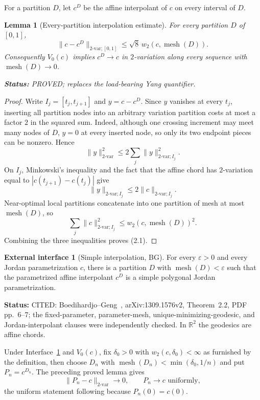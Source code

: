 \documentclass[11pt]{article}
\newtheorem{lemma}[theorem]{Lemma}
\theoremstyle{definition}
\newtheorem{hypothesis}[theorem]{External interface}
\theoremstyle{remark}
\newcommand{\R}{\mathbb R}
\newcommand{\mesh}{\operatorname{mesh}}
\newcommand{\status}[1]{\par\smallskip\noindent\textbf{Status:}
  \begingroup\small\sffamily #1.\endgroup\par\smallskip}
\begin{document}
For a partition $D$, let $c^D$ be the affine interpolant of $c$ on every
interval of $D$.

\begin{lemma}[Every-partition interpolation estimate]
For every partition $D$ of $[0,1]$,
\[
 \|c-c^D\|_{2\text{-var};[0,1]}
 \leq \sqrt8\,w_2(c,\mesh(D)).                         \tag{2.1}
\]
Consequently $V_0(c)$ implies $c^D\to c$ in $2$-variation along
\emph{every} sequence with $\mesh(D)\to0$.
\status{PROVED; replaces the load-bearing Yang quantifier}
\end{lemma}

\begin{proof}
Write $I_j=[t_j,t_{j+1}]$ and $y=c-c^D$.  Since $y$ vanishes at every
$t_j$, inserting all partition nodes into an arbitrary variation partition
costs at most a factor $2$ in the squared sum.  Indeed, although one
crossing increment may meet many nodes of $D$, $y=0$ at every inserted
node, so only its two endpoint pieces can be nonzero.  Hence
\[
 \|y\|_{2\text{-var}}^2
 \leq2\sum_j\|y\|_{2\text{-var};I_j}^2.
\]
On $I_j$, Minkowski's inequality and the fact that the affine chord has
$2$-variation equal to $|c(t_{j+1})-c(t_j)|$ give
\[
 \|y\|_{2\text{-var};I_j}
 \leq2\|c\|_{2\text{-var};I_j}.
\]
Near-optimal local partitions concatenate into one partition of mesh at
most $\mesh(D)$, so
\[
 \sum_j\|c\|_{2\text{-var};I_j}^2
 \leq w_2(c,\mesh(D))^2.
\]
Combining the three inequalities proves (2.1).
\end{proof}

\begin{hypothesis}[Simple interpolation, BG]\label{hyp:bg}
For every $\varepsilon>0$ and every Jordan parametrization $c$, there is a
partition $D$ with $\mesh(D)<\varepsilon$ such that the parametrized affine
interpolant $c^D$ is a simple polygonal Jordan parametrization.
\status{CITED: Boedihardjo--Geng~\cite{BG}, arXiv:1309.1576v2, Theorem~2.2,
PDF pp.~6--7; the fixed-parameter, parameter-mesh, unique-minimizing-geodesic,
and Jordan-interpolant clauses were independently checked.  In $\R^2$ the
geodesics are affine chords}
\end{hypothesis}

Under Interface~\ref{hyp:bg} and $V_0(c)$, fix
$\delta_0>0$ with $w_2(c,\delta_0)<\infty$ as furnished by the definition,
then choose $D_n$ with
$\mesh(D_n)<\min(\delta_0,1/n)$ and put $P_n=c^{D_n}$.  The preceding proved
lemma gives
\[
 \|P_n-c\|_{2\text{-var}}\to0,
 \qquad P_n\to c\text{ uniformly},                       \tag{2.2}
\]
the uniform statement following because $P_n(0)=c(0)$.
\end{document}
